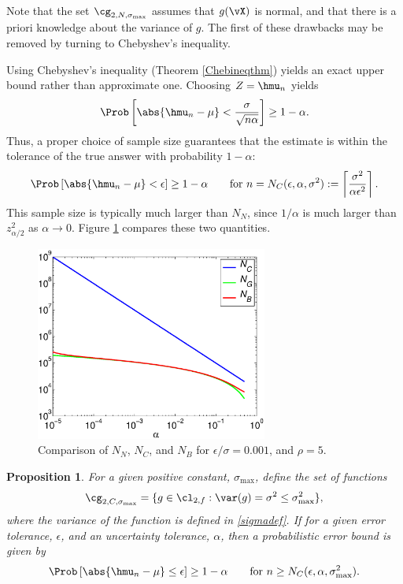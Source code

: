 \documentclass[12pt]{amsart}
\newtheorem{prop}[theorem]{Proposition}
\begin{document}
Note that the set $\cg_{2,N,\sigma_{\max}}$ assumes that $g(\vX)$ is normal, and that there is a priori knowledge about the variance of $g$.  The first of these drawbacks may be removed by turning to Chebyshev's inequality.

Using Chebyshev's inequality (Theorem \ref{Chebineqthm}) yields an exact upper bound rather than approximate one.  Choosing $Z=\hmu_n$ yields
\[
\Prob\left[\abs{\hmu_n-\mu} < \frac{\sigma}{\sqrt{n \alpha}} \right] \ge 1-\alpha.
\]
Thus, a proper choice of sample size guarantees that the estimate is within the tolerance of the true answer with probability $1-\alpha$:
\begin{equation} \label{Cheberr}
\Prob\left[\abs{\hmu_n-\mu} < \epsilon \right] \ge 1-\alpha \qquad \text{for } n= N_C(\epsilon,\alpha,\sigma^2):= \left \lceil \frac{\sigma^2}{\alpha\epsilon^2} \right \rceil.
\end{equation}
This sample size is typically much larger than $N_N$, since $1/\alpha$ is much larger than $z_{\alpha/2}^2$ as $\alpha \to 0$.  Figure \ref{alphacomparefig} compares these two quantities.

\begin{figure}
\centering
\includegraphics[width=3in]{alphacompare.eps}
\caption{Comparison of $N_N$, $N_C$, and $N_B$ for $\epsilon/\sigma = 0.001$, and $\rho=5$. \label{alphacomparefig}}
\end{figure}

\begin{prop} \label{nonadaptChebprop} For a given positive constant, $\sigma_{\max}$, define the set of functions 
\[
\cg_{2,C,\sigma_{\max}}= \{g \in \cl_{2,f} : \var(g)= \sigma^2 \le \sigma^2_{\max} \},
\]
where the variance of the function is defined in \eqref{sigmadef}.  If for a given error tolerance, $\epsilon$, and an uncertainty tolerance, $\alpha$, then a probabilistic error bound is given by 
\[
\Prob\left[\abs{\hmu_n-\mu} \le \epsilon \right] \ge 1-\alpha \qquad \text{for } n\ge N_{C}(\epsilon,\alpha,\sigma_{\max}^2).
\]
\end{prop}
\end{document}

